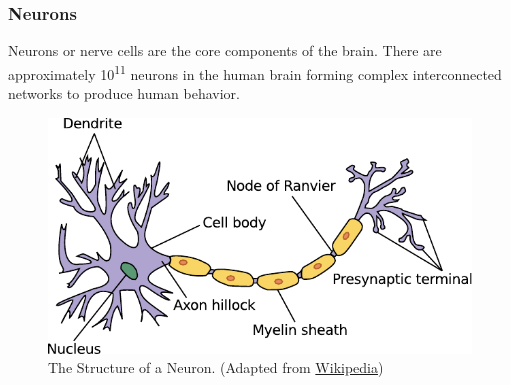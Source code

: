 \documentclass[12pt]{article}
\newcommand\mysubsubsection[1]{\subsubsection{#1}}
\numberwithin{equation}{section}
\numberwithin{figure}{section}
\numberwithin{table}{section}
\begin{document}
\mysubsubsection{Neurons}\label{seq:neural_principles_neurons}

\par{
    Neurons or nerve cells are the core components of the brain. There are
    approximately 10\textsuperscript{11} neurons in the human brain \citep{kandel_principles_2013}
    forming complex interconnected networks to produce human behavior.

\begin{figure}[ht]
    \centering
    \includegraphics[scale=0.9]{images/neuron}
    \caption[The Structure of a Neuron.]{The Structure of a Neuron. (Adapted from \href{http://commons.wikimedia.org/wiki/File:Neuron.svg}{Wikipedia})}
    \label{fig:neuron}
\end{figure}
}
\end{document}
